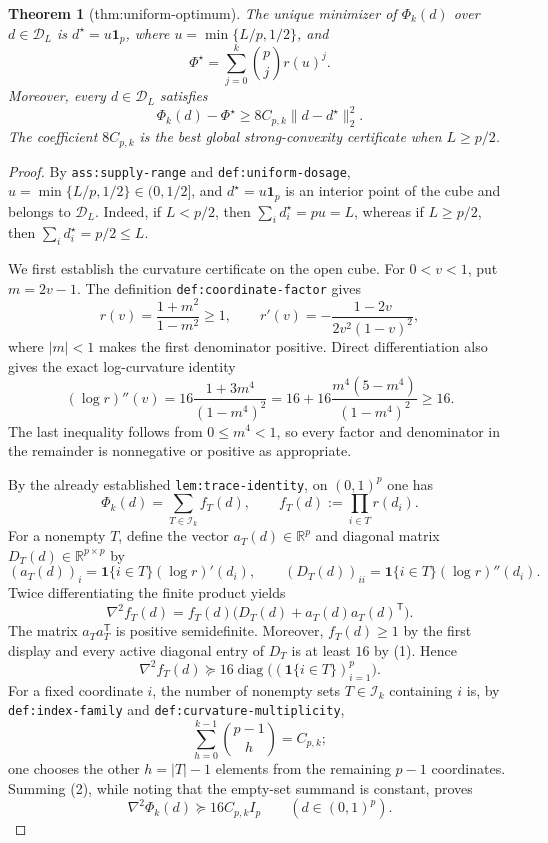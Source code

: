 \documentclass{article}
\newtheorem{theorem}{Theorem}
\begin{document}
\begin{theorem}[thm:uniform-optimum]\label{thm:uniform-optimum}
The unique minimizer of \(\Phi_k(d)\) over \(d\in\mathcal D_L\) is \(d^\star=u\mathbf 1_p\), where \(u=\min\{L/p,1/2\}\), and \[\Phi^\star=\sum_{j=0}^{k}\binom pj r(u)^j.\] Moreover, every \(d\in\mathcal D_L\) satisfies \[\Phi_k(d)-\Phi^\star\ge 8C_{p,k}\|d-d^\star\|_2^2.\] The coefficient \(8C_{p,k}\) is the best global strong-convexity certificate when \(L\ge p/2\).
\end{theorem}
\begin{proof}
By \texttt{ass:supply-range} and \texttt{def:uniform-dosage},
\(u=\min\{L/p,1/2\}\in(0,1/2]\), and \(d^\star=u\mathbf 1_p\) is an interior point of the cube and belongs to \(\mathcal D_L\).  Indeed, if \(L<p/2\), then \(\sum_i d_i^\star=pu=L\), whereas if \(L\ge p/2\), then \(\sum_i d_i^\star=p/2\le L\).

We first establish the curvature certificate on the open cube.  For \(0<v<1\), put \(m=2v-1\).  The definition \texttt{def:coordinate-factor} gives
\[
 r(v)=\frac{1+m^2}{1-m^2}\ge 1,
\qquad
 r'(v)=-\frac{1-2v}{2v^2(1-v)^2},
\]
where \(|m|<1\) makes the first denominator positive.  Direct differentiation also gives the exact log-curvature identity
\[
 (\log r)''(v)
 =16\frac{1+3m^4}{(1-m^4)^2}
 =16+16\frac{m^4(5-m^4)}{(1-m^4)^2}
 \ge 16. \tag{1}
\]
The last inequality follows from \(0\le m^4<1\), so every factor and denominator in the remainder is nonnegative or positive as appropriate.

By the already established \texttt{lem:trace-identity}, on \((0,1)^p\) one has
\[
 \Phi_k(d)=\sum_{T\in\mathcal I_k} f_T(d),
 \qquad
 f_T(d):=\prod_{i\in T}r(d_i).
\]
For a nonempty \(T\), define the vector \(a_T(d)\in\mathbb R^p\) and diagonal matrix \(D_T(d)\in\mathbb R^{p\times p}\) by
\[
 (a_T(d))_i=\mathbf 1\{i\in T\}(\log r)'(d_i),
 \qquad
 (D_T(d))_{ii}=\mathbf 1\{i\in T\}(\log r)''(d_i).
\]
Twice differentiating the finite product yields
\[
 \nabla^2 f_T(d)
 =f_T(d)\bigl(D_T(d)+a_T(d)a_T(d)^{\mathsf T}\bigr).
\]
The matrix \(a_Ta_T^{\mathsf T}\) is positive semidefinite.  Moreover, \(f_T(d)\ge1\) by the first display and every active diagonal entry of \(D_T\) is at least \(16\) by (1).  Hence
\[
 \nabla^2 f_T(d)\succeq
 16\operatorname{diag}\bigl((\mathbf 1\{i\in T\})_{i=1}^p\bigr). \tag{2}
\]
For a fixed coordinate \(i\), the number of nonempty sets \(T\in\mathcal I_k\) containing \(i\) is, by \texttt{def:index-family} and \texttt{def:curvature-multiplicity},
\[
 \sum_{h=0}^{k-1}\binom{p-1}{h}=C_{p,k};
\]
one chooses the other \(h=|T|-1\) elements from the remaining \(p-1\) coordinates.  Summing (2), while noting that the empty-set summand is constant, proves
\[
 \nabla^2\Phi_k(d)\succeq16C_{p,k}I_p
 \qquad(d\in(0,1)^p). \tag{3}
\]


\end{proof}
\end{document}
